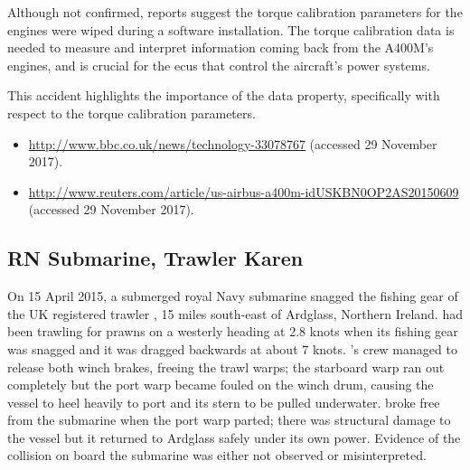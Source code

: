 Although not confirmed, reports suggest the torque calibration parameters for the engines were wiped during a software installation. The torque calibration data is needed to measure and interpret \gls{information} coming back from the A400M's engines, and is crucial for the \glspl{ecu} that control the aircraft's power systems. 

This accident highlights the importance of the  \gls{data property}, specifically with respect to the torque calibration parameters.

\begin{samepage}
\begin{itemize}
  \item \raggedright{\href{http://www.bbc.co.uk/news/technology-33078767}{http://www.bbc.co.uk/news/technology-33078767} (accessed 29 November 2017).}
  \item \raggedright{\href{http://www.reuters.com/article/us-airbus-a400m-idUSKBN0OP2AS20150609}{http://www.reuters.com/article/us-airbus-a400m-idUSKBN0OP2AS20150609} (accessed 29 November 2017).}
\end{itemize}
\end{samepage}


\subsection{RN Submarine, Trawler Karen} \label{bkm:incacc:subtrawler}
On 15 April 2015, a submerged royal Navy submarine snagged the fishing gear of the UK registered trawler , 15 miles south-east of Ardglass, Northern Ireland.  had been trawling for prawns on a westerly heading at 2.8 knots when its fishing gear was snagged and it was dragged backwards at about 7 knots. 's crew managed to release both winch brakes, freeing the trawl warps; the starboard warp ran out completely but the port warp became fouled on the winch drum, causing the vessel to heel heavily to port and its stern to be pulled underwater.  broke free from the submarine when the port warp parted; there was structural damage to the vessel but it returned to Ardglass safely under its own power. Evidence of the collision on board the submarine was either not observed or misinterpreted. 

